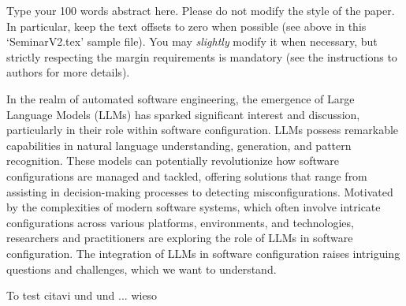 Type your 100 words abstract here. Please do not modify the style
of the paper. In particular, keep the text offsets to zero when
possible (see above in this `SeminarV2.tex' sample file). You may
\emph{slightly} modify it when necessary, but strictly respecting
the margin requirements is mandatory (see the instructions to
authors for more details).

In the realm of automated software engineering, the
emergence of Large Language Models (LLMs) has sparked
significant interest and discussion, particularly in their role
within software configuration. LLMs possess remarkable
capabilities in natural language understanding, generation,
and pattern recognition. These models can potentially
revolutionize how software configurations are managed and
tackled, offering solutions that range from assisting in
decision-making processes to detecting misconfigurations.
Motivated by the complexities of modern software systems,
which often involve intricate configurations across various
platforms, environments, and technologies, researchers and
practitioners are exploring the role of LLMs in software
configuration. The integration of LLMs in software
configuration raises intriguing questions and challenges, which we want to understand.

To test citavi \cite{Mandal.2023} und \cite{Shan.2024} und \cite{Lian.2023} ... wieso 